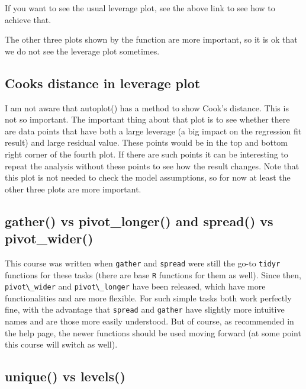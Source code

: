 \documentclass[
  letterpaper,
  8pt,
  a4paper]{book}
\begin{document}
If you want to see the usual leverage plot, see the above link to see
how to achieve that.

The other three plots shown by the function are more important, so it is
ok that we do not see the leverage plot sometimes.

\subsection*{Cooks distance in leverage
plot}\label{cooks-distance-in-leverage-plot}

I am not aware that autoplot() has a method to show Cook's distance.
This is not so important. The important thing about that plot is to see
whether there are data points that have both a large leverage (a big
impact on the regression fit result) and large residual value. These
points would be in the top and bottom right corner of the fourth plot.
If there are such points it can be interesting to repeat the analysis
without these points to see how the result changes. Note that this plot
is not needed to check the model assumptions, so for now at least the
other three plots are more important.

\subsection*{gather() vs pivot\_longer() and spread() vs
pivot\_wider()}\label{gather-vs-pivot_longer-and-spread-vs-pivot_wider}

This course was written when \texttt{gather} and \texttt{spread} were
still the go-to \texttt{tidyr} functions for these tasks (there are base
\texttt{R} functions for them as well). Since then,
\texttt{pivot\textbackslash{}\_wider} and
\texttt{pivot\textbackslash{}\_longer} have been released, which have
more functionalities and are more flexible. For such simple tasks both
work perfectly fine, with the advantage that \texttt{spread} and
\texttt{gather} have slightly more intuitive names and are those more
easily understood. But of course, as recommended in the help page, the
newer functions should be used moving forward (at some point this course
will switch as well).

\subsection*{unique() vs levels()}\label{unique-vs-levels}
\end{document}
